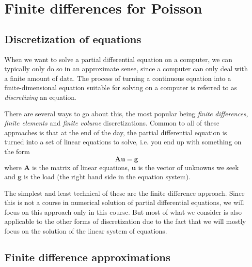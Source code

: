 \chapter{Finite differences for Poisson}

\section{Discretization of equations}

When we want to solve a partial differential equation on a computer, we can
typically only do so in an approximate sense, since a computer can only deal
with a finite amount of data. The process of turning a continuous equation into
a finite-dimensional equation suitable for solving on a computer is referred to
as \emph{discretizing} an equation.

There are several ways to go about this, the most popular being \emph{finite
differences}, \emph{finite elements} and \emph{finite volume} discretizations.
Common to all of these approaches is that at the end of the day, the partial
differential equation is turned into a set of linear equations to solve, i.e.
you end up with something on the form
\[
  \bm A \bm u = \bm g
\]
where $\bm A$ is the matrix of linear equations, $\bm u$ is the vector of
unknowns we seek and $\bm g$ is the load (the right hand side in the equation
system).

The simplest and least technical of these are the finite difference approach.
Since this is not a course in numerical solution of partial differential
equations, we will focus on this approach only in this course. But most of what
we consider is also applicable to the other forms of discretization due to the
fact that we will mostly focus on the solution of the linear system of
equations.

\section{Finite difference approximations}

